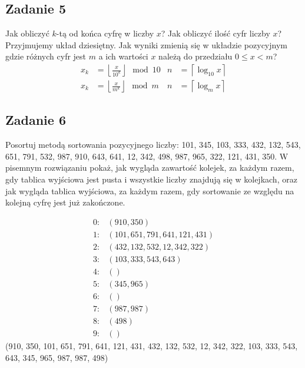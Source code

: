 \documentclass{article}
\begin{document}
\subsection*{Zadanie 5}
Jak obliczyć $k$-tą od końca cyfrę w liczby $x$? Jak obliczyć ilość cyfr liczby $x$? Przyjmujemy
układ dziesiętny. Jak wyniki zmienią się w układzie pozycyjnym gdzie różnych cyfr jest $m$ a ich
wartości $x$ należą do przedziału $0 \leq x < m$?
\begin{align*}
    x_k & = \left \lfloor \frac{x}{10^k} \right \rfloor \mod 10 & n & = \left \lceil \log_{10} x \right \rceil \\
    x_k & = \left \lfloor \frac{x}{m^k} \right \rfloor \mod m   & n & = \left \lceil \log_m x \right \rceil
\end{align*}

\pagebreak
\subsection*{Zadanie 6}
Posortuj metodą sortowania pozycyjnego liczby: 101, 345, 103, 333, 432, 132, 543, 651,
791, 532, 987, 910, 643, 641, 12, 342, 498, 987, 965, 322, 121, 431, 350. W pisemnym
rozwiązaniu pokaż, jak wygląda zawartość kolejek, za każdym razem, gdy tablica
wyjściowa jest pusta i wszystkie liczby znajdują się w kolejkach, oraz jak wygląda
tablica wyjściowa, za każdym razem, gdy sortowanie ze względu na kolejną cyfrę jest już zakończone.

\begin{align*}
    0: & \left(910, 350\right)                     \\
    1: & \left(101, 651, 791, 641, 121, 431\right) \\
    2: & \left(432, 132, 532, 12, 342, 322\right)  \\
    3: & \left(103, 333, 543, 643\right)           \\
    4: & \left(\right)                             \\
    5: & \left(345, 965\right)                     \\
    6: & \left(\right)                             \\
    7: & \left(987, 987\right)                     \\
    8: & \left(498\right)                          \\
    9: & \left(\right)
\end{align*}
(910, 350, 101, 651, 791, 641, 121, 431, 432, 132, 532, 12, 342, 322, 103, 333, 543, 643, 345, 965, 987, 987, 498)
\end{document}
